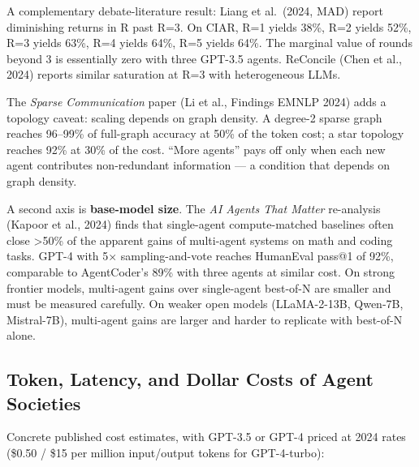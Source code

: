 A complementary debate-literature result: Liang et al.~(2024, MAD) report diminishing returns in R past R=3. On CIAR, R=1 yields 38\%, R=2 yields 52\%, R=3 yields 63\%, R=4 yields 64\%, R=5 yields 64\%. The marginal value of rounds beyond 3 is essentially zero with three GPT-3.5 agents. ReConcile (Chen et al., 2024) reports similar saturation at R=3 with heterogeneous LLMs.

The \emph{Sparse Communication} paper (Li et al., Findings EMNLP 2024) adds a topology caveat: scaling depends on graph density. A degree-2 sparse graph reaches 96--99\% of full-graph accuracy at 50\% of the token cost; a star topology reaches 92\% at 30\% of the cost. ``More agents'' pays off only when each new agent contributes non-redundant information --- a condition that depends on graph density.

A second axis is \textbf{base-model size}. The \emph{AI Agents That Matter} re-analysis (Kapoor et al., 2024) finds that single-agent compute-matched baselines often close \textgreater50\% of the apparent gains of multi-agent systems on math and coding tasks. GPT-4 with 5× sampling-and-vote reaches HumanEval pass@1 of 92\%, comparable to AgentCoder's 89\% with three agents at similar cost. On strong frontier models, multi-agent gains over single-agent best-of-N are smaller and must be measured carefully. On weaker open models (LLaMA-2-13B, Qwen-7B, Mistral-7B), multi-agent gains are larger and harder to replicate with best-of-N alone.

\subsection{Token, Latency, and Dollar Costs of Agent Societies}\label{token-latency-and-dollar-costs-of-agent-societies}

Concrete published cost estimates, with GPT-3.5 or GPT-4 priced at 2024 rates (\$0.50 / \$15 per million input/output tokens for GPT-4-turbo):

